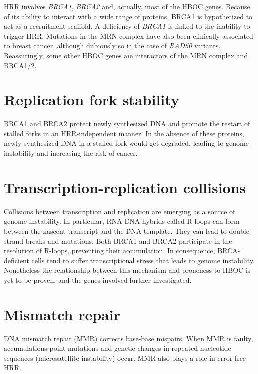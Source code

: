 \documentclass[
  11pt,
]{env/yjiao}
\begin{document}
HRR involves \emph{BRCA1}, \emph{BRCA2} and, actually, most of the HBOC genes. Because of its ability to interact with a wide range of proteins, BRCA1 is hypothetized to act as a recruitment scaffold. A deficiency of \emph{BRCA1} is linked to the inability to trigger HRR. Mutations in the MRN complex have also been clinically associated to breast cancer, although dubiously so in the case of \emph{RAD50} variants. Reassuringly, some other HBOC genes are interactors of the MRN complex and BRCA1/2.

\hypertarget{replication-fork-stability}{%
\section{Replication fork stability}\label{replication-fork-stability}}

BRCA1 and BRCA2 protect newly synthesized DNA and promote the restart of stalled forks in an HRR-independent manner. In the absence of these proteins, newly synthesized DNA in a stalled fork would get degraded, leading to genome instability and increasing the risk of cancer.

\hypertarget{transcription-replication-collisions}{%
\section{Transcription-replication collisions}\label{transcription-replication-collisions}}

Collisions between transcription and replication are emerging as a source of genome instability. In particular, RNA-DNA hybrids called R-loops can form between the nascent transcript and the DNA template. They can lead to double-strand breaks and mutations. Both BRCA1 and BRCA2 participate in the resolution of R-loops, preventing their accumulation. In consequence, BRCA-deficient cells tend to suffer transcriptional stress that leads to genome instability. Nonetheless the relationship between this mechanism and proneness to HBOC is yet to be proven, and the genes involved further investigated.

\hypertarget{mismatch-repair}{%
\section{Mismatch repair}\label{mismatch-repair}}

DNA mismatch repair (MMR) corrects base-base mispairs. When MMR is faulty, accumulations point mutations and genetic changes in repeated nucleotide sequences (microsatellite instability) occur. MMR also plays a role in error-free HRR.
\end{document}
